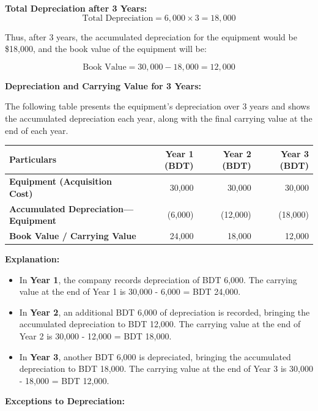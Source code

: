 \documentclass[12pt,a4paper]{book}
\begin{document}
\textbf{Total Depreciation after 3 Years:}  
\[
\text{Total Depreciation} = 6,000 \times 3 = 18,000
\]

Thus, after 3 years, the accumulated depreciation for the equipment would be \$18,000, and the book value of the equipment will be:

\[
\text{Book Value} = 30,000 - 18,000 = 12,000
\]

\vspace{0.5cm}

\textbf{Depreciation and Carrying Value for 3 Years:}

The following table presents the equipment's depreciation over 3 years and shows the accumulated depreciation each year, along with the final carrying value at the end of each year.

\vspace{0.5cm}
\begin{center}
\begin{tabular}{|l|r|r|r|}
\hline
\textbf{Particulars} & \textbf{Year 1 (BDT)} & \textbf{Year 2 (BDT)} & \textbf{Year 3 (BDT)} \\
\hline
\textbf{Equipment (Acquisition Cost)} & 30,000 & 30,000 & 30,000 \\
\hline
\textbf{Accumulated Depreciation—Equipment} & (6,000) & (12,000) & (18,000) \\
\hline
\textbf{Book Value / Carrying Value} & 24,000 & 18,000 & 12,000 \\
\hline
\end{tabular}
\end{center}

\vspace{0.5cm}
\textbf{Explanation:}
\begin{itemize}
    \item In \textbf{Year 1}, the company records depreciation of BDT 6,000. The carrying value at the end of Year 1 is 30,000 - 6,000 = BDT 24,000.
    \item In \textbf{Year 2}, an additional BDT 6,000 of depreciation is recorded, bringing the accumulated depreciation to BDT 12,000. The carrying value at the end of Year 2 is 30,000 - 12,000 = BDT 18,000.
    \item In \textbf{Year 3}, another BDT 6,000 is depreciated, bringing the accumulated depreciation to BDT 18,000. The carrying value at the end of Year 3 is 30,000 - 18,000 = BDT 12,000.
\end{itemize}


\vspace{1cm}
\textbf{Exceptions to Depreciation:}
\end{document}
